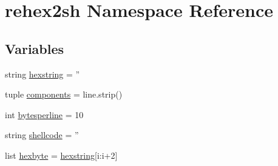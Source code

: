 \hypertarget{namespacerehex2sh}{\section{rehex2sh \-Namespace \-Reference}
\label{namespacerehex2sh}
}
\subsection*{\-Variables}
\begin{DoxyCompactItemize}
\item 
string \hyperlink{namespacerehex2sh_ae94339789f7c777c35511b0d5e15f985}{hexstring} = ''
\item 
tuple \hyperlink{namespacerehex2sh_a46d30aa0b79379b0ae46b60e57e3a36b}{components} = line.\-strip()
\item 
int \hyperlink{namespacerehex2sh_a6871a6d428039f71f95e8fafadae894e}{bytesperline} = 10
\item 
string \hyperlink{namespacerehex2sh_adc89af6fa1de3747a0439ec88e8e947f}{shellcode} = ''
\item 
list \hyperlink{namespacerehex2sh_aac23a21b6bd08055ad23d4b30b34367b}{hexbyte} = \hyperlink{namespacerehex2sh_ae94339789f7c777c35511b0d5e15f985}{hexstring}\mbox{[}i\-:i+2\mbox{]}
\end{DoxyCompactItemize}


